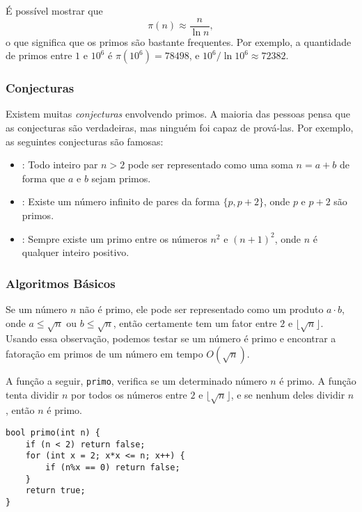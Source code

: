É possível mostrar que
\[\pi(n) \approx \frac{n}{\ln n},\]
o que significa que os primos são bastante frequentes. Por exemplo, a quantidade de primos entre $1$ e $10^6$ é $\pi(10^6)=78498$, e $10^6 / \ln 10^6 \approx 72382$.

\subsubsection{Conjecturas}

Existem muitas \emph{conjecturas} envolvendo primos. A maioria das pessoas pensa que as conjecturas são verdadeiras, mas ninguém foi capaz de prová-las. Por exemplo, as seguintes conjecturas são famosas:

\begin{itemize}
\item {}:
Todo inteiro par $n>2$ pode ser representado como uma soma $n=a+b$ de forma que $a$ e $b$ sejam primos.
\item {}:
Existe um número infinito de pares da forma $\{p,p+2\}$, onde $p$ e $p+2$ são primos.
\item {}:
Sempre existe um primo entre os números $n^2$ e $(n+1)^2$, onde $n$ é qualquer inteiro positivo.
\end{itemize}

\subsubsection{Algoritmos Básicos}

Se um número $n$ não é primo, ele pode ser representado como um produto $a \cdot b$, onde $a \le \sqrt n$ ou $b \le \sqrt n$, então certamente tem um fator entre $2$ e $\lfloor \sqrt n \rfloor$. Usando essa observação, podemos testar se um número é primo e encontrar a fatoração em primos de um número em tempo $O(\sqrt n)$.

A função a seguir, \texttt{primo}, verifica se um determinado número $n$ é primo. A função tenta dividir $n$ por todos os números entre $2$ e $\lfloor \sqrt n \rfloor$, e se nenhum deles dividir $n$, então $n$ é primo.

\begin{lstlisting}
bool primo(int n) {
    if (n < 2) return false;
    for (int x = 2; x*x <= n; x++) {
        if (n%x == 0) return false;
    }
    return true;
}
\end{lstlisting}

